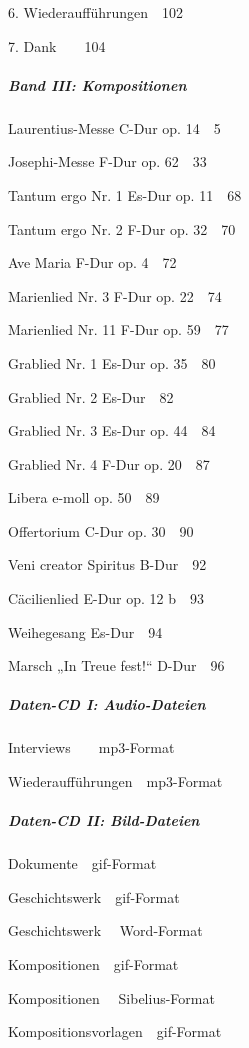 \documentclass[a4paper]{article}
\begin{document}
6. Wiederaufführungen\ \ 102

7. Dank\ \ \ \ 104

\subparagraph{Band III: Kompositionen}
{\textquotedbl}Laurentius{\textquotedbl}-Messe C-Dur op. 14\ \ 5

{\textquotedbl}Josephi{\textquotedbl}-Messe F-Dur op. 62\ \ 33

Tantum ergo Nr. 1 Es-Dur op. 11\ \ 68

Tantum ergo Nr. 2 F-Dur op. 32\ \ 70

Ave Maria F-Dur op. 4\ \ 72

Marienlied Nr. 3 F-Dur op. 22\ \ 74

Marienlied Nr. 11 F-Dur op. 59\ \ 77

Grablied Nr. 1 Es-Dur op. 35\ \ 80

Grablied Nr. 2 Es-Dur\ \ 82

Grablied Nr. 3 Es-Dur op. 44\ \ 84

Grablied Nr. 4 F-Dur op. 20\ \ 87

Libera e-moll op. 50\ \ 89

Offertorium C-Dur op. 30\ \ 90

Veni creator Spiritus B-Dur\ \ 92

Cäcilienlied E-Dur op. 12 b\ \ 93

Weihegesang Es-Dur\ \ 94

Marsch „In Treue fest!“ D-Dur\ \ 96

\subparagraph[Daten{}-CD I: Audio{}-Dateien]{Daten-CD I: Audio-Dateien}
Interviews\ \ \ \ mp3-Format

Wiederaufführungen\ \ mp3-Format

\subparagraph{Daten-CD II: Bild-Dateien}
Dokumente\ \ gif-Format

Geschichtswerk\ \ gif-Format

Geschichtswerk \ \ Word-Format

Kompositionen\ \ gif-Format

Kompositionen \ \ Sibelius-Format

Kompositionsvorlagen\ \ gif-Format
\end{document}
